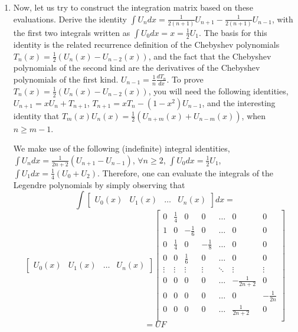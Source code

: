 \documentclass{article}
\begin{document}
\begin{enumerate}
    \item Now, let us try to construct the integration matrix based on these evaluations. Derive the identity $\int U_ndx = \frac{1}{2(n+1)}U_{n+1}-\frac{1}{2(n+1)}U_{n-1}$, with the first two integrals written as $\int U_0dx=x=\frac{1}{2}U_1$. The basis for this identity is the related recurrence definition of the Chebyshev polynomials $T_n(x)=\frac{1}{2}(U_n(x)-U_{n-2}(x))$, and the fact that the Chebyshev polynomials of the second kind are the derivatives of the Chebyshev polynomials of the first kind. $U_{n-1}=\frac{1}{n}\frac{dT_n}{dx}$. To prove $T_n(x)=\frac{1}{2}(U_n(x)-U_{n-2}(x))$, you will need the following 
    identities, $U_{n+1}=xU_n+T_{n+1}$, $T_{n+1}=xT_n-(1-x^2)U_{n-1}$, and the interesting identity that $T_m(x)U_n(x)=\frac{1}{2}(U_{n+m}(x)+U_{n-m}(x))$, when $n \geq m-1$. 
    \par
    We make use of the following (indefinite) integral identities, $\int U_ndx=\frac{1}{2n+2}(U_{n+1}-U_{n-1})$, $\forall n \geq2$, $\int U_0dx=\frac{1}{2}U_1$, $\int U_1dx=\frac{1}{4}(U_0+U_2)$. Therefore, one can evaluate the integrals of the Legendre polynomials by simply observing that 
    \begin{equation*}
    \int 
    \begin{bmatrix}
        U_0(x) & U_1(x) & \dots & U_n(x)
    \end{bmatrix}dx = 
    \end{equation*}
    \begin{equation*}
    \begin{bmatrix}
        U_0(x) & U_1(x) & \dots & U_n(x)
    \end{bmatrix}
    \begin{bmatrix}
        0 & \frac{1}{4} & 0 & 0 & \dots & 0 & 0 \\
        1 & 0 & -\frac{1}{6} & 0 & \dots & 0 & 0 \\
        0 & \frac{1}{4} & 0 & -\frac{1}{8} & \dots & 0 & 0 \\
        0 & 0 & \frac{1}{6} & 0 & \dots & 0 & 0 \\
        \vdots & \vdots & \vdots & \vdots & \ddots & \vdots & \vdots \\
        0 & 0 & 0 & 0 & \dots & -\frac{1}{2n+2} & 0 \\
        0 & 0 & 0 & 0 & \dots & 0 & -\frac{1}{2n} \\
        0 & 0 & 0 & 0 & \dots & \frac{1}{2n+2} & 0 \\
    \end{bmatrix}
    \end{equation*}
    \begin{equation*}
        =UF
    \end{equation*}


\end{enumerate}
\end{document}
